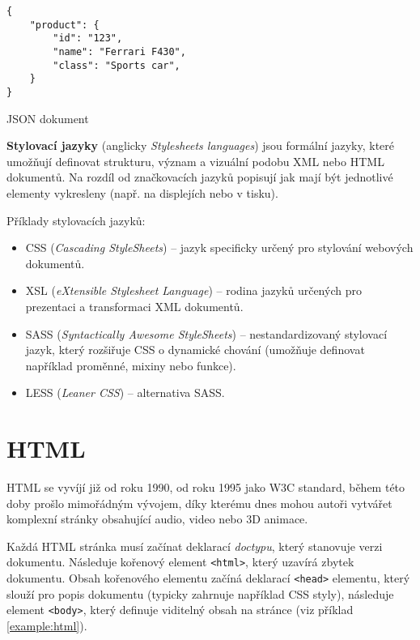 \begin{example}
    \centering
    \begin{lstlisting}
{
    "product": {
        "id": "123",
        "name": "Ferrari F430",
        "class": "Sports car",
    }
}
    \end{lstlisting}
    \caption{JSON dokument}
    \label{example:json}
\end{example}

\textbf{Stylovací jazyky} (anglicky \textit{Stylesheets languages}) jsou formální jazyky, které umožňují definovat strukturu, význam a vizuální podobu XML nebo HTML dokumentů. Na rozdíl od značkovacích jazyků popisují jak mají být jednotlivé elementy vykresleny (např. na displejích nebo v tisku).

Příklady stylovacích jazyků:

\begin{itemize}
    \item CSS (\textit{Cascading StyleSheets}) -- jazyk specificky určený pro stylování webových dokumentů.
    \item XSL (\textit{eXtensible Stylesheet Language}) -- rodina jazyků určených pro prezentaci a transformaci XML dokumentů.
    \item SASS (\textit{Syntactically Awesome StyleSheets}) -- nestandardizovaný stylovací jazyk, který rozšiřuje CSS o dynamické chování (umožňuje definovat například proměnné, mixiny nebo funkce).
    \item LESS (\textit{Leaner CSS}) -- alternativa SASS.
\end{itemize}

\section{HTML}
\label{sec:html}

HTML se vyvíjí již od roku 1990, od roku 1995 jako W3C standard, během této doby prošlo mimořádným vývojem, díky kterému dnes mohou autoři vytvářet komplexní stránky obsahující audio, video nebo 3D animace.

Každá HTML stránka musí začínat deklarací \textit{doctypu}, který stanovuje verzi dokumentu. Následuje kořenový element \texttt{<html>}, který uzavírá zbytek dokumentu. Obsah kořenového elementu začíná deklarací \texttt{<head>} elementu, který slouží pro popis dokumentu (typicky zahrnuje například CSS styly), následuje element \texttt{<body>}, který definuje viditelný obsah na stránce (viz příklad \ref{example:html}).

